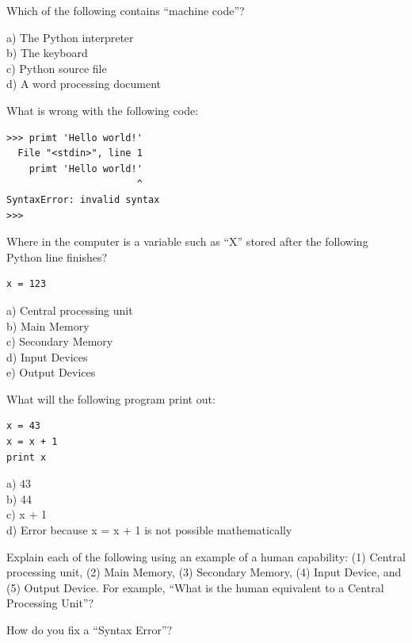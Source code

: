 \begin{ex}
Which of the following contains ``machine code''?

a) The Python interpreter\\
b) The keyboard\\
c) Python source file\\
d) A word processing document
\end{ex}

\begin{ex}
What is wrong with the following code:

\beforeverb
\begin{verbatim}
>>> primt 'Hello world!'
  File "<stdin>", line 1
    primt 'Hello world!'
                       ^
SyntaxError: invalid syntax
>>> 
\end{verbatim}
\afterverb

\end{ex}

\begin{ex}
Where in the computer is a variable such as ``X'' stored 
after the following Python line finishes?

\beforeverb
\begin{verbatim}
x = 123
\end{verbatim}
\afterverb
%
a) Central processing unit\\
b) Main Memory\\
c) Secondary Memory\\
d) Input Devices\\
e) Output Devices
\end{ex}

\begin{ex}
What will the following program print out:

\beforeverb
\begin{verbatim}
x = 43
x = x + 1
print x
\end{verbatim}
\afterverb
%
a) 43\\
b) 44\\
c) x + 1\\
d) Error because x = x + 1 is not possible mathematically
\end{ex}

\begin{ex}
Explain each of the following using an example of a human capability: 
(1) Central processing unit, (2) Main Memory, (3) Secondary Memory, 
(4) Input Device, and
(5) Output Device.
For example, ``What is the human equivalent to a Central Processing Unit''? 
\end{ex}

\begin{ex}
How do you fix a ``Syntax Error''?
\end{ex}


